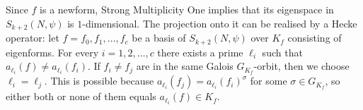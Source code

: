 \documentclass[11pt, a4paper, reqno]{amsart}
\theoremstyle{definition}
\theoremstyle{plain}
\theoremstyle{remark}
\begin{document}
\begin{list}{}
  {%
    \setlength{\leftmargin}{0pt}%
    \setlength{\labelwidth}{-0.25cm}%
    \setlength{\labelsep}{0.25cm}%
    \setlength{\itemsep}{0.5cm}
    \renewcommand{\makelabel}[1]{\textbf{#1}:\hfil}%
  }
    \item[Projection onto $f$-eigenspace] Since $f$ is a newform, Strong Multiplicity One implies that its eigenspace in $S_{k+2}(N,\psi)$ is $1$-dimensional. The projection onto it can be realised by a Hecke operator: let $f=f_0,f_1,\ldots,f_c$ be a basis of $S_{k+2}(N,\psi)$ over $K_f$ consisting of eigenforms. For every $i=1,2,\ldots,c$ there exists a prime $\ell_i$ such that $a_{\ell_i}(f) \neq a_{\ell_i}(f_i)$. If $f_i\neq f_j$ are in the same Galois $G_{K_f}$-orbit, then we choose $\ell_i=\ell_j$. This is possible because $a_{\ell_i}(f_j) = a_{\ell_i}(f_i)^{\sigma}$ for some $\sigma\in G_{K_f}$, so either both or none of them equals $a_{\ell_i}(f)\in K_f$.


\end{list}
\end{document}

